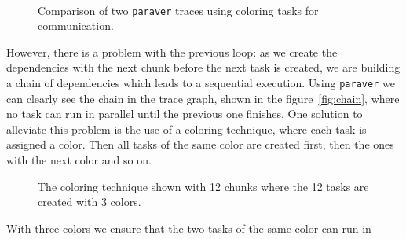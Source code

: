 \begin{figure}[h]%
	\centering
	\\
	\caption{Comparison of two \texttt{paraver} traces using coloring tasks for 
	communication.}
\end{figure}%
%
However, there is a problem with the previous loop: as we create the 
dependencies with the next chunk before the next task is created, we are 
building a chain of dependencies which leads to a sequential execution.  Using 
\texttt{paraver} we can clearly see the chain in the trace graph, shown in the 
figure~\ref{fig:chain}, where no task can run in parallel until the previous one 
finishes.  One solution to alleviate this problem is the use of a coloring 
technique, where each task is assigned a color.  Then all tasks of the same 
color are created first, then the ones with the next color and so on.
%
\begin{figure}[ht]%
\centering
{}
\caption{The coloring technique shown with 12 chunks where the 12 tasks are 
created with 3 colors.}
\label{fig:coloring}
\end{figure}%
%
With three colors we ensure that the two tasks of the same color can run in 
